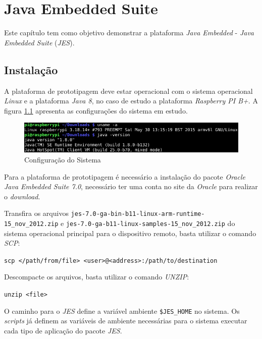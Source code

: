 %


\chapter{Java Embedded Suite}

Este capítulo tem como objetivo demonstrar a plataforma \textit{Java Embedded}
- \textit{Java Embedded Suite} (\textit{JES}).

\section{Instalação}

A plataforma de prototipagem deve estar operacional com o sistema operacional
\textit{Linux} e a plataforma \textit{Java 8}, no caso de estudo a plataforma
\textit{Raspberry PI B+}. A figura \ref{fig:jes/configuracao} apresenta as
configurações do sistema em estudo.

\begin{figure}[H]
    \centering
    \includegraphics[width=0.7\linewidth]{figuras/java/configuracao}
    \caption{Configuração do Sistema}
    \label{fig:jes/configuracao}
\end{figure}

Para a plataforma de prototipagem é necessário a instalação do pacote
\textit{Oracle Java Embedded Suite 7.0}, necessário ter uma conta no site da
\textit{Oracle} para realizar o \textit{download}.

Transfira os arquivos \newline
\verb|jes-7.0-ga-bin-b11-linux-arm-runtime-15_nov_2012.zip|
 e \newline
\verb|jes-7.0-ga-b11-linux-samples-15_nov_2012.zip|
 do sistema operacional principal para o dispositivo remoto, basta
utilizar o comando \textit{SCP}:

\verb|scp </path/from/file> <user>@<address>:/path/to/destination|

Descompacte os arquivos, basta utilizar o comando \textit{UNZIP}:

\verb|unzip <file>|

O caminho para o \textit{JES} define a variável ambiente
\verb|$JES_HOME| no sistema. Os \textit{scripts} já definem as variáveis de
ambiente necessárias para o sistema executar cada tipo de aplicação do pacote
\textit{JES}.

